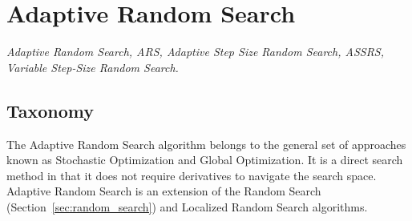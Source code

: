 

\section{Adaptive Random Search} 
\label{sec:adaptive_random_search}

\emph{Adaptive Random Search, ARS, Adaptive Step Size Random Search, ASSRS, Variable Step-Size Random Search.}

\subsection{Taxonomy}
The Adaptive Random Search algorithm belongs to the general set of approaches known as Stochastic Optimization and Global Optimization. It is a direct search method in that it does not require derivatives to navigate the search space.
Adaptive Random Search is an extension of the Random Search (Section~\ref{sec:random_search}) and Localized Random Search algorithms.


